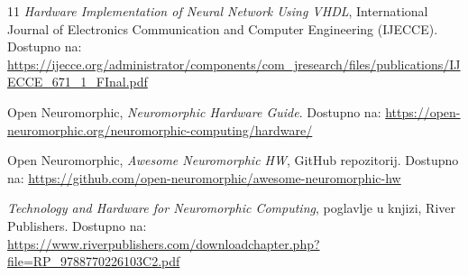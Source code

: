 \begin{thebibliography}{11}
    \textit{Hardware Implementation of Neural Network Using VHDL},
    International Journal of Electronics Communication and Computer Engineering (IJECCE).
    Dostupno na: \url{https://ijecce.org/administrator/components/com_jresearch/files/publications/IJECCE_671_1_FInal.pdf}

    Open Neuromorphic,
    \textit{Neuromorphic Hardware Guide}.
    Dostupno na: \url{https://open-neuromorphic.org/neuromorphic-computing/hardware/}

    Open Neuromorphic,
    \textit{Awesome Neuromorphic HW}, GitHub repozitorij.
    Dostupno na: \url{https://github.com/open-neuromorphic/awesome-neuromorphic-hw}

    \textit{Technology and Hardware for Neuromorphic Computing}, poglavlje u knjizi,
    River Publishers.
    Dostupno na: \url{https://www.riverpublishers.com/downloadchapter.php?file=RP_9788770226103C2.pdf}

\end{thebibliography}
